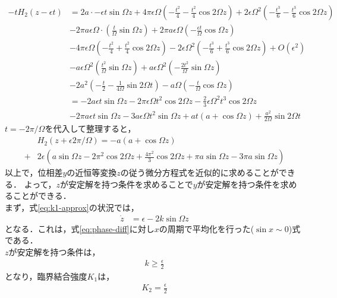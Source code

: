 \documentclass[../main]{subfiles}
\begin{document}
    \begin{align*}
        -tH_2(z-\epsilon t)&=2a\cdot -\epsilon t\sin\Omega z+4\pi\epsilon\Omega\left( -\frac{t^2}{4} -\frac{t^2}{4}\cos 2\Omega z\right)+2\epsilon\Omega^2\left( -\frac{t^3}{6} -\frac{t^3}{6}\cos 2\Omega z\right)\\
        &-2\pi a\epsilon\Omega\cdot\left(\frac{t}{\Omega}\sin\Omega z\right)+2\pi a\epsilon\Omega\left(-\frac{\epsilon t}{\Omega}\cos\Omega z\right)\\
        &-4\pi\epsilon\Omega\left(-\frac{t^2}{4}+\frac{t^2}{4}\cos 2\Omega z\right)-2\epsilon\Omega^2\left( -\frac{t^3}{6} +\frac{t^3}{6}\cos 2\Omega z\right)+O(\epsilon^2)\\
        &-a\epsilon\Omega^2\left( \frac{t^2}{\Omega}\sin\Omega z \right)+a\epsilon\Omega^2\left( -\frac{2t^2}{\Omega}\sin\Omega z \right)\\
        &-2a^2\left( -\frac{t}{2}-\frac{1}{4\Omega} \sin 2\Omega t\right)-a\Omega \left( -\frac{t}{\Omega} \cos\Omega z\right)\\
        &=-2a\epsilon t\sin\Omega z-2\pi\epsilon\Omega t^2\cos 2\Omega z-\frac{2}{3}\epsilon\Omega^2t^3\cos 2\Omega z\\
        &-2\pi a\epsilon t\sin\Omega z-3a\epsilon\Omega t^2\sin\Omega z+at(a+\cos\Omega z)+\frac{a^2}{2\Omega}\sin 2\Omega t
    \end{align*}
    $t=-2\pi/\Omega$を代入して整理すると，
    \begin{align*}
        &H_2(z+\epsilon 2\pi/\Omega)=-a(a+\cos\Omega z)\\
        +&2\epsilon\left( a\sin\Omega z-2\pi^2\cos2\Omega z+\frac{4\pi^2}{3} \cos 2\Omega z+\pi a\sin\Omega z-3\pi a\sin\Omega z\right)
    \end{align*}
    以上で，位相差$y$の近恒等変換$z$の従う微分方程式を近似的に求めることができる．
    よって，$z$が安定解を持つ条件を求めることで$y$が安定解を持つ条件を求めることができる．\\
    まず，式\eqref{eq:k1-approx}の状況では，
    \begin{align*}
        \dot{z}&=\epsilon-2k\sin\Omega z
    \end{align*}
    となる．これは，式\eqref{eq:phase-diff}に対し$x$の周期で平均化を行った($\sin x\sim 0$)式である．\\
    $z$が安定解を持つ条件は，
    \begin{align*}
        k\geq\frac{\epsilon}{2}
    \end{align*}
    となり，臨界結合強度$K_1$は，
    \begin{align*}
        K_2=\frac{\epsilon}{2}
    \end{align*}
\end{document}
